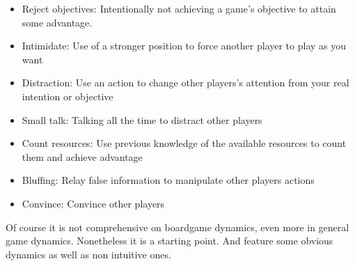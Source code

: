 \begin{multicols}{2}
\begin{itemize}
    \item Reject objectives: Intentionally not achieving a game's objective to attain some advantage.
    \item Intimidate: Use of a stronger position to force another player to play as you want
    \item Distraction: Use an action to change other players's attention from your real intention or objective
    \item Small talk: Talking all the time to distract other players
    \item Count resources: Use previous knowledge of the available resources to count them and achieve advantage
    \item Bluffing: Relay false information to manipulate other players actions
    \item Convince: Convince other players
\end{itemize}
\end{multicols}
Of course it is not comprehensive on boardgame dynamics, even more in general game dynamics. Nonetheless it is a starting point. And feature some obvious dynamics as well as non intuitive ones.
